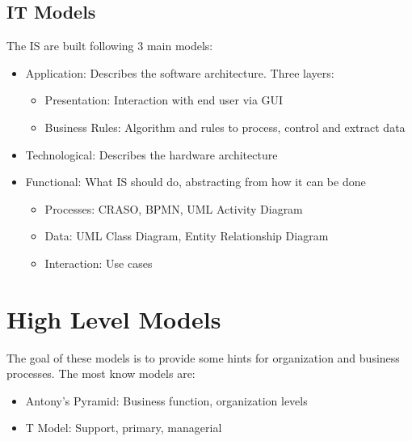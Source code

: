 \documentclass[12pt]{article}
\begin{document}
\subsection{IT Models}
The IS are built following 3 main models:
\begin{itemize}
  \item Application: Describes the software architecture. Three layers:
  \begin{itemize}
    \item Presentation: Interaction with end user via GUI
    \item Business Rules: Algorithm and rules to process, control and extract data
  \end{itemize}
  \item Technological: Describes the hardware architecture
  \item Functional: What IS should do, abstracting from how it can be done
  \begin{itemize}
    \item Processes: CRASO, BPMN, UML Activity Diagram
    \item Data: UML Class Diagram, Entity Relationship Diagram
    \item Interaction: Use cases
  \end{itemize}
\end{itemize}
\section{High Level Models}
The goal of these models is to provide some hints for organization and business processes. The most know models are:
\begin{itemize}
  \item Antony's Pyramid: Business function, organization levels
  \item T Model: Support, primary, managerial
\end{itemize}
\end{document}
